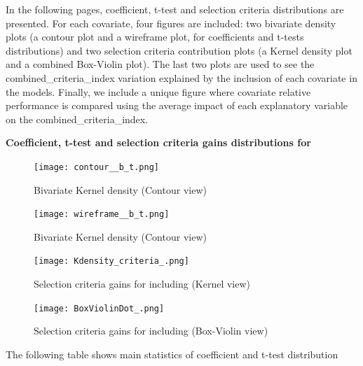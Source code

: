 \documentclass{article}
\begin{document}
In the following pages, coefficient, t-test and selection criteria distributions are presented. For each covariate, four figures are included: two bivariate density plots (a contour plot and a wireframe plot, for coefficients and t-tests distributions) and two selection criteria contribution plots (a Kernel density plot and a combined Box-Violin plot). The last two plots are used to see the combined\_criteria\_index variation explained by the inclusion of each covariate in the models. 
Finally, we include a unique figure where covariate relative performance is compared using the average impact of each explanatory variable on the combined\_criteria\_index.

\clearpage

\begin{center}
    \large{\textbf{Coefficient, t-test and selection criteria gains distributions for  }}
\end{center}

\vspace{-5mm}

\begin{figure}[!ht]
  \centering
  \begin{minipage}[b]{0.46\textwidth}
    \centering
    \texttt{[image: contour\_\_b\_t.png]}
    \caption{Bivariate Kernel density (Contour view)}
  \end{minipage}
  \hfill
  \begin{minipage}[b]{0.53\textwidth}
    \centering
    \texttt{[image: wireframe\_\_b\_t.png]}
    \caption{Bivariate Kernel density (Contour view)}
  \end{minipage}

  \begin{minipage}[b]{0.48\textwidth}
    \centering
    \texttt{[image: Kdensity\_criteria\_.png]}
    \caption{Selection criteria gains for including  (Kernel view)}
  \end{minipage}
  \hfill
  \begin{minipage}[b]{0.48\textwidth}
    \centering    
    \texttt{[image: BoxViolinDot\_.png]}
    \caption{Selection criteria gains for including  (Box-Violin view)}    
  \end{minipage}
\end{figure}

\vspace{1cm}

The following table shows main statistics of coefficient and t-test distribution 
\end{document}

